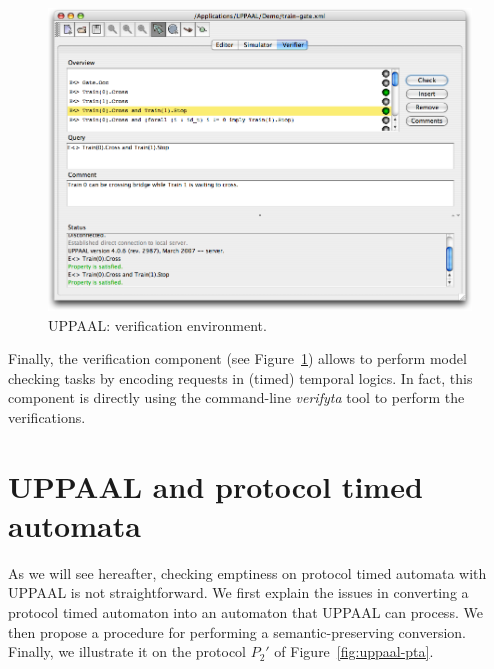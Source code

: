 \begin{figure}[htbp]
    \centering
    \includegraphics[width=\textwidth]{content/timed-automata/uppaal-3}
    \caption{UPPAAL: verification environment.}
    \label{fig:uppaal-3}
\end{figure}

Finally, the verification component (see Figure~\ref{fig:uppaal-3}) allows to perform model checking tasks by encoding requests in (timed) temporal logics. In fact, this component is directly using the command-line \emph{verifyta} tool to perform the verifications.


\chapter{UPPAAL and protocol timed automata}
\label{chap:uppaal-pta}


As we will see hereafter, checking emptiness on protocol timed automata with UPPAAL is not straightforward. We first explain the issues in converting a protocol timed automaton into an automaton that UPPAAL can process. We then propose a procedure for performing a semantic-preserving conversion. Finally, we illustrate it on the protocol $P_2'$ of Figure~\ref{fig:uppaal-pta}.\\


